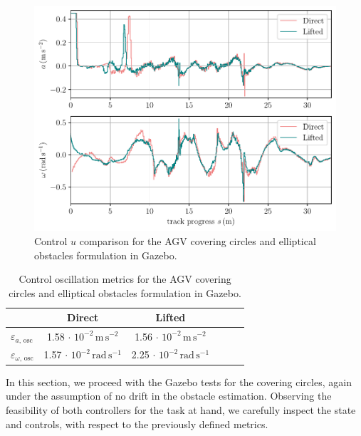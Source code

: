 \begin{figure}[h!tb]
    \includegraphics[width=1\textwidth]{figures/experiments/u}
    \caption{Control $u$ comparison for the \ac{AGV} covering circles and elliptical obstacles formulation in Gazebo.}  \label{fig_comp_u}
\end{figure}
\begin{table}[h!tb]
    \small
	\begin{center}
        \begin{tabular}{lccccl}\toprule
		    & \textbf{Direct} & \textbf{Lifted}\\
            \midrule
            $\varepsilon_{a,\,\mathrm{osc}} $ & 1.58 $\cdot$ $10^{-2}\,\mathrm{m\,s^{-2}}$& 1.56 $\cdot$ $10^{-2}\,\mathrm{m\,s^{-2}}$\\
            $\varepsilon_{\omega,\,\mathrm{osc}} $ & 1.57 $\cdot$ $10^{-2}\,\mathrm{rad\,s^{-1}}$& 2.25 $\cdot$ $10^{-2}\,\mathrm{rad\,s^{-1}}$\\
		    \bottomrule
		\end{tabular}
	\end{center}
    \caption{Control oscillation metrics for the \ac{AGV} covering circles and elliptical obstacles formulation in Gazebo.}
    \label{tab_u_osc_2el}
\end{table}

In this section, we proceed with the Gazebo tests for the covering circles, again under the assumption of no drift in the obstacle estimation. Observing the feasibility of both controllers for the task at hand, we carefully inspect the state and controls, with respect to the previously defined metrics.

